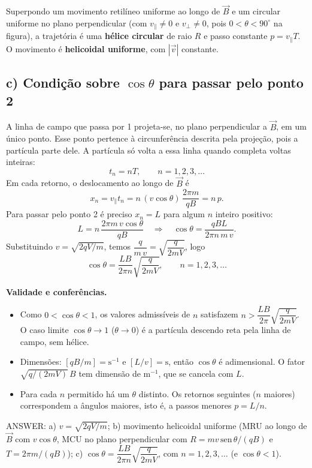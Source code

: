 \documentclass{article}%
\begin{document}
Superpondo um movimento retilíneo uniforme ao longo de $\vec B$ e um circular uniforme no plano perpendicular (com $v_\parallel\neq0$ e $v_\perp\neq0$, pois $0<\theta<90^\circ$ na figura), a trajetória é uma \textbf{hélice circular} de raio $R$ e passo constante $p=v_\parallel T$. O movimento é \textbf{helicoidal uniforme}, com $|\vec v|$ constante.

\subsection*{c) Condição sobre $\cos\theta$ para passar pelo ponto 2}

A linha de campo que passa por 1 projeta-se, no plano perpendicular a $\vec B$, em um único ponto. Esse ponto pertence à circunferência descrita pela projeção, pois a partícula parte dele. A partícula só volta a essa linha quando completa voltas inteiras:
\[
t_n=nT,\qquad n=1,2,3,\dots
\]
Em cada retorno, o deslocamento ao longo de $\vec B$ é
\[
x_n=v_\parallel t_n=n\,(v\cos\theta)\,\frac{2\pi m}{qB}=n\,p .
\]
Para passar pelo ponto 2 é preciso $x_n=L$ para algum $n$ inteiro positivo:
\[
L=n\,\frac{2\pi m\,v\cos\theta}{qB}
\quad\Longrightarrow\quad
\cos\theta=\frac{qBL}{2\pi n\,m\,v}.
\]
Substituindo $v=\sqrt{2qV/m}$, temos $\dfrac{q}{m\,v}=\sqrt{\dfrac{q}{2mV}}$, logo
\[
\boxed{\cos\theta=\frac{LB}{2\pi n}\sqrt{\frac{q}{2mV}},\qquad n=1,2,3,\dots}
\]

\textbf{Validade e conferências.}
\begin{itemize}
\item Como $0<\cos\theta<1$, os valores admissíveis de $n$ satisfazem $n>\dfrac{LB}{2\pi}\sqrt{\dfrac{q}{2mV}}$. O caso limite $\cos\theta\to1$ ($\theta\to0$) é a partícula descendo reta pela linha de campo, sem hélice.
\item Dimensões: $[qB/m]=\mathrm{s^{-1}}$ e $[L/v]=\mathrm{s}$, então $\cos\theta$ é adimensional. O fator $\sqrt{q/(2mV)}\,B$ tem dimensão de $\mathrm{m^{-1}}$, que se cancela com $L$.
\item Para cada $n$ permitido há um $\theta$ distinto. Os retornos seguintes ($n$ maiores) correspondem a ângulos maiores, isto é, a passos menores $p=L/n$.
\end{itemize}

ANSWER: a) $v=\sqrt{2qV/m}$; b) movimento helicoidal uniforme (MRU ao longo de $\vec B$ com $v\cos\theta$, MCU no plano perpendicular com $R=mv\,\mathrm{sen}\,\theta/(qB)$ e $T=2\pi m/(qB)$); c) $\cos\theta=\dfrac{LB}{2\pi n}\sqrt{\dfrac{q}{2mV}}$, com $n=1,2,3,\dots$ (e $\cos\theta<1$).%
\newpage%
\end{document}
